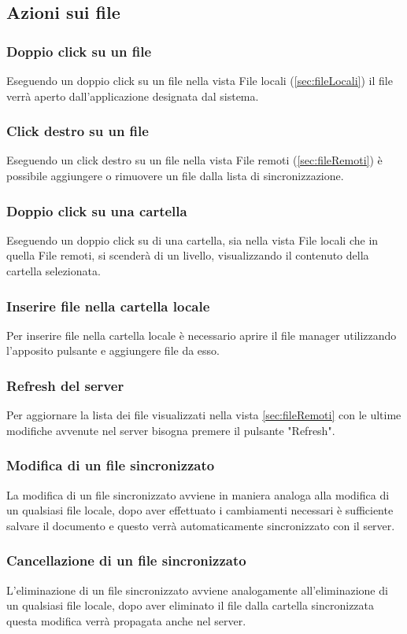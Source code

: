 \subsection{Azioni sui file}
\label{sec:fileActions}

\subsubsection{Doppio click su un file}
Eseguendo un doppio click su un file nella vista File locali (\ref{sec:fileLocali}) il file verrà aperto dall'applicazione designata dal sistema.
\subsubsection{Click destro su un file}
Eseguendo un click destro su un file nella vista File remoti (\ref{sec:fileRemoti}) è possibile aggiungere o rimuovere un file dalla lista di sincronizzazione.  
\subsubsection{Doppio click su una cartella}
Eseguendo un doppio click su di una cartella, sia nella vista File locali che in quella File remoti, si scenderà di un livello, visualizzando il contenuto della cartella selezionata.
\subsubsection{Inserire file nella cartella locale}
Per inserire file nella cartella locale è necessario aprire il file manager utilizzando l'apposito pulsante e aggiungere file da esso.
\subsubsection{Refresh del server}
Per aggiornare la lista dei file visualizzati nella vista \ref{sec:fileRemoti} con le ultime modifiche avvenute nel server bisogna premere il pulsante "Refresh".
\subsubsection{Modifica di un file sincronizzato}
La modifica di un file sincronizzato avviene in maniera analoga alla modifica di un qualsiasi file locale, dopo aver effettuato i cambiamenti necessari è sufficiente salvare il documento e questo verrà automaticamente sincronizzato con il server.
\subsubsection{Cancellazione di un file sincronizzato}
L'eliminazione di un file sincronizzato avviene analogamente all'eliminazione di un qualsiasi file locale, dopo aver eliminato il file dalla cartella sincronizzata questa modifica verrà propagata anche nel server.

